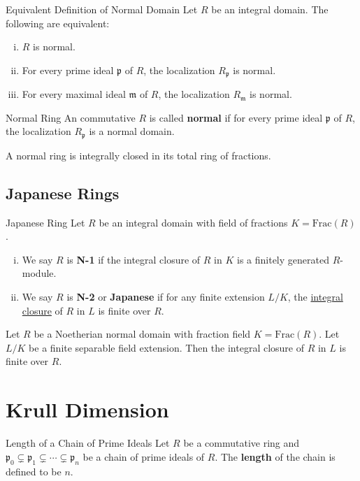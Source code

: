 \begin{proposition}{Equivalent Definition of Normal Domain}{}
    Let $R$ be an integral domain. The following are equivalent:
    \begin{enumerate}[(i)]
        \item $R$ is normal.
        \item For every prime ideal $\mathfrak{p}$ of $R$, the localization $R_\mathfrak{p}$ is normal.
        \item For every maximal ideal $\mathfrak{m}$ of $R$, the localization $R_\mathfrak{m}$ is normal.
    \end{enumerate}
\end{proposition}


\begin{definition}{Normal Ring}{}
    An commutative $R$ is called \textbf{normal} if for every prime ideal $\mathfrak{p}$ of $R$, the localization $R_\mathfrak{p}$ is a normal domain.
\end{definition}
\begin{proposition}{}{}
A normal ring is integrally closed in its total ring of fractions.
\end{proposition}

\subsection{Japanese Rings}
\begin{definition}{Japanese Ring}{}
    Let $R$ be an integral domain with field of fractions $K=\mathrm{Frac}(R)$.
    \begin{enumerate}[(i)]
        \item We say $R$ is \textbf{N-1} if the integral closure of $R$ in $K$ is a finitely generated $R$-module.
        \item We say $R$ is \textbf{N-2} or \textbf{Japanese} if for any finite extension $L/K$, the \hyperref[th:integral_closure]{integral closure} of $R$ in $L$ is finite over $R$.
    \end{enumerate}
\end{definition}

\begin{proposition}{}{}
    Let $R$ be a Noetherian normal domain with fraction field $K=\mathrm{Frac}(R)$. Let $L/K$ be a finite separable field extension. Then the integral closure of $R$ in $L$ is finite over $R$.
\end{proposition}

\section{Krull Dimension}
\begin{definition}{Length of a Chain of Prime Ideals}{}
    Let $R$ be a commutative ring and $\mathfrak{p}_0\subsetneq\mathfrak{p}_1\subsetneq\cdots\subsetneq\mathfrak{p}_n$ be a chain of prime ideals of $R$. The \textbf{length} of the chain is defined to be $n$.
\end{definition}


